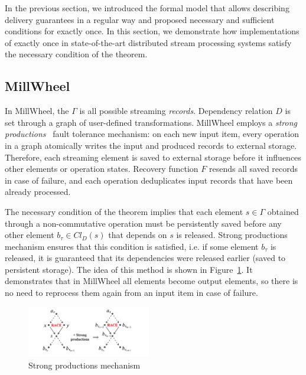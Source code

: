 \label{fs-eo-impl}

In the previous section, we introduced the formal model that allows describing delivery guarantees in a regular way and proposed necessary and sufficient conditions for exactly once. In this section, we demonstrate how implementations of exactly once in state-of-the-art distributed stream processing systems satisfy the necessary condition of the theorem. 

\subsection{MillWheel}

In MillWheel, the $\Gamma$ is all possible streaming {\em records}. Dependency relation $D$ is set through a graph of user-defined transformations. MillWheel employs a {\em strong productions}~\cite{Akidau:2013:MFS:2536222.2536229} fault tolerance mechanism: on each new input item, every operation in a graph atomically writes the input and produced records to external storage. Therefore, each streaming element is saved to external storage before it influences other elements or operation states. Recovery function $F$ resends all saved records in case of failure, and each operation deduplicates input records that have been already processed.

The necessary condition of the theorem implies that each element $s \in \Gamma$ obtained through a non-commutative operation must be persistently saved before any other element $b_{\tau} \in Cl_D(s)$ that depends on $s$ is released. Strong productions mechanism ensures that this condition is satisfied, i.e. if some element $b_\tau$ is released, it is guaranteed that its dependencies were released earlier (saved to persistent storage). The idea of this method is shown in Figure~\ref{millwheel}. It demonstrates that in MillWheel all elements become output elements, so there is no need to reprocess them again from an input item in case of failure. 

\begin{figure}[htbp]
  \centering
  \includegraphics[width=0.48\textwidth]{pics/millwheel}
  \caption{Strong productions mechanism}
  \label{millwheel}
\end{figure}

